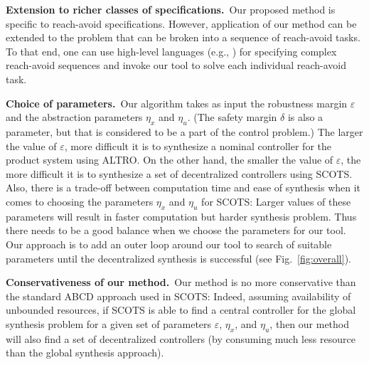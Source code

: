 {\smallskip
\noindent\textbf{Extension to richer classes of specifications.}\
Our proposed method is specific to reach-avoid specifications. However, application of our method can be extended to the problem that can be broken into a sequence of reach-avoid tasks. To that end, one can use high-level languages (e.g., \cite{Majumdar2020,Ghosh2020}) for specifying complex reach-avoid sequences and invoke our tool to solve each individual reach-avoid task.

\smallskip
\noindent\textbf{Choice of parameters.}\
Our algorithm takes as input the robustness margin $\varepsilon$ and the abstraction parameters $\eta_x$ and $\eta_u$.
(The safety margin $\delta$ is also a parameter, but that is considered to be a part of the control problem.)
The larger the value of $\varepsilon$, more difficult it is to synthesize a nominal controller for the product system using ALTRO.
On the other hand, the smaller the value of $\varepsilon$, the more difficult it is to synthesize a set of decentralized controllers using SCOTS.
Also, there is a trade-off between computation time and ease of synthesis when it comes to choosing the parameters $\eta_x$ and $\eta_u$ for SCOTS: Larger values of these parameters will result in faster computation but harder synthesis problem.
Thus there needs to be a good balance when we choose the parameters for our tool.
Our approach is to add an outer loop around our tool to search of suitable parameters until the decentralized synthesis is successful (see Fig.~\ref{fig:overall}).

\smallskip
\noindent\textbf{Conservativeness of our method.}\
Our method is no more conservative than the standard ABCD approach used in SCOTS:
Indeed, assuming availability of unbounded resources, if SCOTS is able to find a central controller for the global synthesis problem for a given set of parameters $\varepsilon$, $\eta_x$, and $\eta_u$, then our method will also find a set of decentralized controllers (by consuming much less resource than the global synthesis approach).
}

